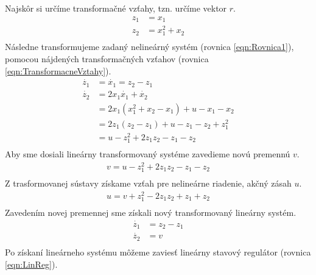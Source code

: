 \documentclass[../main.tex]{subfiles}
\begin{document}
Najskôr si určíme transformačné vzťahy, tzn. určíme vektor $r$.
\begin{equation}
	\begin{aligned}
        z_1 &= x_1 \\
		z_2 &= x_1^2 + x_2 \\
	\end{aligned}
	\label{eqn:TransformacneVztahy}
\end{equation}
Následne transformujeme zadaný nelineárný systém (rovnica \ref{eqn:Rovnica1}), pomocou nájdených transformačných vzťahov (rovnica \ref{eqn:TransformacneVztahy}).
\begin{equation}
	\begin{aligned}
	\dot{z_1} &= \dot{x_1} = z_2 - z_1 \\
	\dot{z_2} &= 2x_1\dot{x_1} + \dot{x_2} \\
	          & = 2x_1(x_1^2 + x_2 - x_1) + u - x_1 - x_2 \\
	          & = 2z_1(z_2 - z_1) + u - z_1 - z_2 + z_1^2\\
	          & = u - z_1^2 + 2z_1z_2 - z_1 - z_2 \\
	\end{aligned}
	\label{eqn:TransformovanySystem}
\end{equation}
Aby sme dosiali lineárny transformovaný systéme zavedieme novú premennú $v$.
\begin{equation}
	\begin{split}
	 v = u - z_1^2 + 2z_1z_2 - z_1 - z_2 \\
	\end{split}
	\label{eqn:SubsV}
\end{equation}
Z trasformovanej sústavy získame vzťah pre nelineárne riadenie, akčný zásah $u$.
\begin{equation}
	\begin{gathered}
		u = v + z_1^2 - 2z_1z_2 + z_1 + z_2\\
	\end{gathered}
	\label{eqn:Noveu}
\end{equation}
Zavedením novej premennej sme získali nový transformovaný lineárny systém.
\begin{equation}
	\begin{aligned}
	\dot{z_1}  &= z_2 - z_1 \\
	 \dot{z_2} &= v \\
	\end{aligned}
	\label{eqn:TransformovanySystem}
\end{equation}
Po získaní lineárneho systému môžeme zaviesť lineárny stavový regulátor (rovnica \ref{eqn:LinReg}).
\end{document}
